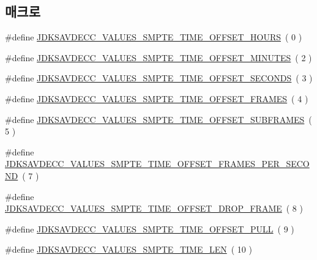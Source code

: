 \subsection*{매크로}
\begin{DoxyCompactItemize}
\item 
\#define \hyperlink{group__values__smpte__time_gacd26bea13515ba1b5b1811ddff657092}{J\+D\+K\+S\+A\+V\+D\+E\+C\+C\+\_\+\+V\+A\+L\+U\+E\+S\+\_\+\+S\+M\+P\+T\+E\+\_\+\+T\+I\+M\+E\+\_\+\+O\+F\+F\+S\+E\+T\+\_\+\+H\+O\+U\+RS}~( 0 )
\item 
\#define \hyperlink{group__values__smpte__time_gaab5ec7ce146a44f4a9d32db3778c3d93}{J\+D\+K\+S\+A\+V\+D\+E\+C\+C\+\_\+\+V\+A\+L\+U\+E\+S\+\_\+\+S\+M\+P\+T\+E\+\_\+\+T\+I\+M\+E\+\_\+\+O\+F\+F\+S\+E\+T\+\_\+\+M\+I\+N\+U\+T\+ES}~( 2 )
\item 
\#define \hyperlink{group__values__smpte__time_ga96b2d4b7d5276cdb5988546f9c2937f5}{J\+D\+K\+S\+A\+V\+D\+E\+C\+C\+\_\+\+V\+A\+L\+U\+E\+S\+\_\+\+S\+M\+P\+T\+E\+\_\+\+T\+I\+M\+E\+\_\+\+O\+F\+F\+S\+E\+T\+\_\+\+S\+E\+C\+O\+N\+DS}~( 3 )
\item 
\#define \hyperlink{group__values__smpte__time_gafee3d52eff70d86e6c7dbf0c10235556}{J\+D\+K\+S\+A\+V\+D\+E\+C\+C\+\_\+\+V\+A\+L\+U\+E\+S\+\_\+\+S\+M\+P\+T\+E\+\_\+\+T\+I\+M\+E\+\_\+\+O\+F\+F\+S\+E\+T\+\_\+\+F\+R\+A\+M\+ES}~( 4 )
\item 
\#define \hyperlink{group__values__smpte__time_ga42c14fa2147422ea17118483aaa630eb}{J\+D\+K\+S\+A\+V\+D\+E\+C\+C\+\_\+\+V\+A\+L\+U\+E\+S\+\_\+\+S\+M\+P\+T\+E\+\_\+\+T\+I\+M\+E\+\_\+\+O\+F\+F\+S\+E\+T\+\_\+\+S\+U\+B\+F\+R\+A\+M\+ES}~( 5 )
\item 
\#define \hyperlink{group__values__smpte__time_ga140c695426360646f03f39624b1881bc}{J\+D\+K\+S\+A\+V\+D\+E\+C\+C\+\_\+\+V\+A\+L\+U\+E\+S\+\_\+\+S\+M\+P\+T\+E\+\_\+\+T\+I\+M\+E\+\_\+\+O\+F\+F\+S\+E\+T\+\_\+\+F\+R\+A\+M\+E\+S\+\_\+\+P\+E\+R\+\_\+\+S\+E\+C\+O\+ND}~( 7 )
\item 
\#define \hyperlink{group__values__smpte__time_ga8e6db5bb04419768dd3e02d7b5ff0f8c}{J\+D\+K\+S\+A\+V\+D\+E\+C\+C\+\_\+\+V\+A\+L\+U\+E\+S\+\_\+\+S\+M\+P\+T\+E\+\_\+\+T\+I\+M\+E\+\_\+\+O\+F\+F\+S\+E\+T\+\_\+\+D\+R\+O\+P\+\_\+\+F\+R\+A\+ME}~( 8 )
\item 
\#define \hyperlink{group__values__smpte__time_ga058ad33b1ebfa0fdf51707a7bc324626}{J\+D\+K\+S\+A\+V\+D\+E\+C\+C\+\_\+\+V\+A\+L\+U\+E\+S\+\_\+\+S\+M\+P\+T\+E\+\_\+\+T\+I\+M\+E\+\_\+\+O\+F\+F\+S\+E\+T\+\_\+\+P\+U\+LL}~( 9 )
\item 
\#define \hyperlink{group__values__smpte__time_ga479451e2d80f4c927b20ef6007ff18d7}{J\+D\+K\+S\+A\+V\+D\+E\+C\+C\+\_\+\+V\+A\+L\+U\+E\+S\+\_\+\+S\+M\+P\+T\+E\+\_\+\+T\+I\+M\+E\+\_\+\+L\+EN}~( 10 )
\end{DoxyCompactItemize}
